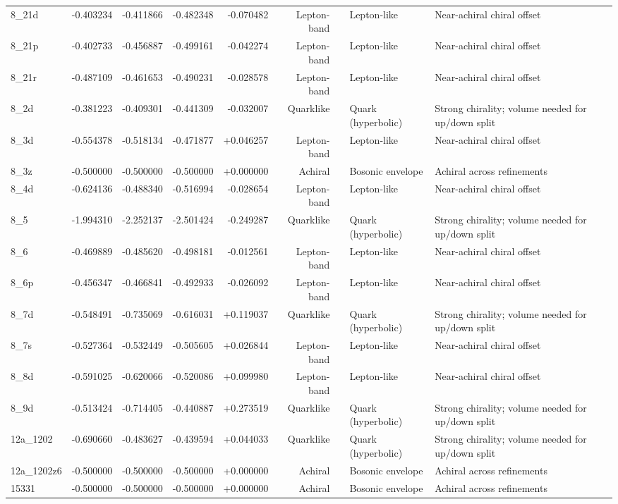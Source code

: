 \documentclass[smallextended]{svjour3}       %
\begin{document}
\begin{longtable}{lrrrrrllp{6.8cm}}
    8\_21d & -0.403234 & -0.411866 & -0.482348 & -0.070482 & Lepton-band &  & Lepton-like & Near-achiral chiral offset \\
    8\_21p & -0.402733 & -0.456887 & -0.499161 & -0.042274 & Lepton-band &  & Lepton-like & Near-achiral chiral offset \\
    8\_21r & -0.487109 & -0.461653 & -0.490231 & -0.028578 & Lepton-band &  & Lepton-like & Near-achiral chiral offset \\
    8\_2d & -0.381223 & -0.409301 & -0.441309 & -0.032007 & Quarklike &  & Quark (hyperbolic) & Strong chirality; volume needed for up/down split \\
    8\_3d & -0.554378 & -0.518134 & -0.471877 & +0.046257 & Lepton-band &  & Lepton-like & Near-achiral chiral offset \\
    8\_3z & -0.500000 & -0.500000 & -0.500000 & +0.000000 & Achiral &  & Bosonic envelope & Achiral across refinements \\
    8\_4d & -0.624136 & -0.488340 & -0.516994 & -0.028654 & Lepton-band &  & Lepton-like & Near-achiral chiral offset \\
    8\_5 & -1.994310 & -2.252137 & -2.501424 & -0.249287 & Quarklike &  & Quark (hyperbolic) & Strong chirality; volume needed for up/down split \\
    8\_6 & -0.469889 & -0.485620 & -0.498181 & -0.012561 & Lepton-band &  & Lepton-like & Near-achiral chiral offset \\
    8\_6p & -0.456347 & -0.466841 & -0.492933 & -0.026092 & Lepton-band &  & Lepton-like & Near-achiral chiral offset \\
    8\_7d & -0.548491 & -0.735069 & -0.616031 & +0.119037 & Quarklike &  & Quark (hyperbolic) & Strong chirality; volume needed for up/down split \\
    8\_7s & -0.527364 & -0.532449 & -0.505605 & +0.026844 & Lepton-band &  & Lepton-like & Near-achiral chiral offset \\
    8\_8d & -0.591025 & -0.620066 & -0.520086 & +0.099980 & Lepton-band &  & Lepton-like & Near-achiral chiral offset \\
    8\_9d & -0.513424 & -0.714405 & -0.440887 & +0.273519 & Quarklike &  & Quark (hyperbolic) & Strong chirality; volume needed for up/down split \\
    12a\_1202 & -0.690660 & -0.483627 & -0.439594 & +0.044033 & Quarklike &  & Quark (hyperbolic) & Strong chirality; volume needed for up/down split \\
    12a\_1202z6 & -0.500000 & -0.500000 & -0.500000 & +0.000000 & Achiral &  & Bosonic envelope & Achiral across refinements \\
    15331 & -0.500000 & -0.500000 & -0.500000 & +0.000000 & Achiral &  & Bosonic envelope & Achiral across refinements \\
    \end{longtable}
\end{document}
